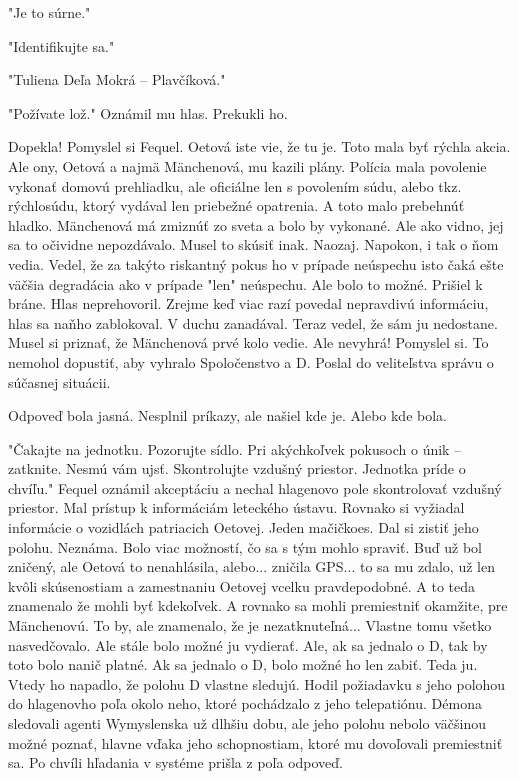 \documentclass{book}
\begin{document}
"$ $Je to súrne."$ $ 

"$ $Identifikujte sa."$ $ 

"$ $Tuliena Deľa Mokrá – Plavčíková."$ $ 

"$ $Požívate lož."$ $  Oznámil mu hlas. Prekukli ho.

Dopekla! Pomyslel si Fequel. Oetová iste vie, že tu je. Toto mala byť rýchla akcia. Ale ony, Oetová a najmä Mänchenová, mu kazili plány. Polícia mala povolenie vykonať domovú prehliadku, ale oficiálne len s povolením súdu, alebo tkz. rýchlosúdu, ktorý vydával len priebežné opatrenia. A toto malo prebehnúť hladko. Mänchenová má zmiznúť zo sveta a bolo by vykonané. Ale ako vidno, jej sa to očividne nepozdávalo. Musel to skúsiť inak. Naozaj. Napokon, i tak o ňom vedia. Vedel, že za takýto riskantný pokus ho v prípade neúspechu isto čaká ešte väčšia degradácia ako v prípade "$ $len"$ $  neúspechu. Ale bolo to možné. Prišiel k bráne. Hlas neprehovoril. Zrejme keď viac razí povedal nepravdivú informáciu, hlas sa naňho zablokoval. V duchu zanadával. Teraz vedel, že sám ju nedostane. Musel si priznať, že Mänchenová prvé kolo vedie. Ale nevyhrá! Pomyslel si. To nemohol dopustiť, aby vyhralo Spoločenstvo a D. Poslal do veliteľstva správu o súčasnej situácii.

Odpoveď bola jasná. Nesplnil príkazy, ale našiel kde je. Alebo kde bola.

"$ $Čakajte na jednotku. Pozorujte sídlo. Pri akýchkoľvek pokusoch o únik – zatknite. Nesmú vám ujsť. Skontrolujte vzdušný priestor. Jednotka príde o chvíľu."$ $  Fequel oznámil akceptáciu a nechal hlagenovo pole skontrolovať vzdušný priestor. Mal prístup k informáciám leteckého ústavu. Rovnako si vyžiadal informácie o vozidlách patriacich Oetovej. Jeden mačičkoes. Dal si zistiť jeho polohu. Neznáma. Bolo viac možností, čo sa s tým mohlo spraviť. Buď už bol zničený, ale Oetová to nenahlásila, alebo... zničila GPS... to sa mu zdalo, už len kvôli skúsenostiam a zamestnaniu Oetovej vcelku pravdepodobné. A to teda znamenalo že mohli byť kdekoľvek. A rovnako sa mohli premiestniť okamžite, pre Mänchenovú. To by, ale znamenalo, že je nezatknuteľná... Vlastne tomu všetko nasvedčovalo. Ale stále bolo možné ju vydierať. Ale, ak sa jednalo o D, tak by toto bolo nanič platné. Ak sa jednalo o D, bolo možné ho len zabiť. Teda ju. Vtedy ho napadlo, že polohu D vlastne sledujú. Hodil požiadavku s jeho polohou do hlagenovho poľa okolo neho, ktoré pochádzalo z jeho telepatiónu. Démona sledovali agenti Wymyslenska už dlhšiu dobu, ale jeho polohu nebolo väčšinou možné poznať, hlavne vďaka jeho schopnostiam, ktoré mu dovoľovali premiestniť sa. Po chvíli hľadania v systéme prišla z poľa odpoveď.
\end{document}
